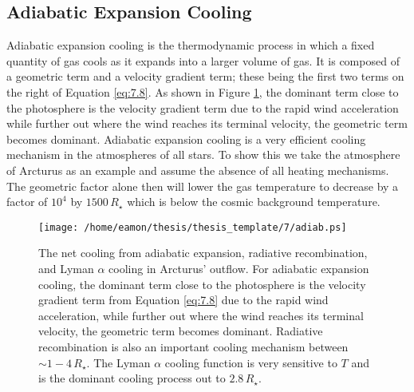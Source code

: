 \subsection{Adiabatic Expansion Cooling}\label{sec:7.3.1}
Adiabatic expansion cooling is the thermodynamic process in which a fixed quantity of gas cools as it expands into a larger volume of gas. It is composed of a geometric term and a velocity gradient term; these being the first two terms on the right of Equation \ref{eq:7.8}. As shown in Figure \ref{fig:7.1}, the dominant term close to the photosphere is the velocity gradient term due to the rapid wind acceleration while further out where the wind reaches its terminal velocity, the geometric term becomes dominant. Adiabatic expansion cooling is a very efficient cooling mechanism in the atmospheres of all stars. To show this we take the atmosphere of Arcturus as an example and assume the absence of all heating mechanisms. The geometric factor alone then will lower the gas temperature to decrease by a factor of $10^4$ by $1500\,R_{\star}$ which is below the cosmic background temperature. 

\begin{figure}[!ht]
\centering 
         \texttt{[image: /home/eamon/thesis/thesis\_template/7/adiab.ps]}
\caption[]{The net cooling from adiabatic expansion, radiative recombination, and Lyman $\alpha$ cooling in Arcturus' outflow. For adiabatic expansion cooling, the dominant term close to the photosphere is the velocity gradient term from Equation \ref{eq:7.8} due to the rapid wind acceleration, while further out where the wind reaches its terminal velocity, the geometric term becomes dominant. Radiative recombination is also an important cooling mechanism between $\sim 1-4\,R_{\star}$. The Lyman $\alpha$ cooling function is very sensitive to $T$ and is the dominant cooling process out to $2.8\,R_{\star}$.}
\label{fig:7.1}
\end{figure}

